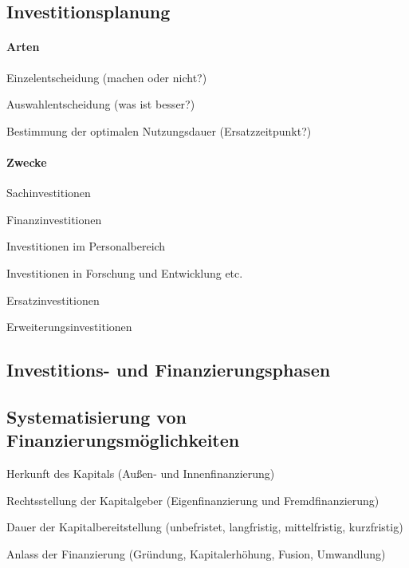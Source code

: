 \clearpage
\subsection{Investitionsplanung}
\paragraph{Arten}
\begin{compactitem}
	\item Einzelentscheidung (machen oder nicht?)
	\item Auswahlentscheidung (was ist besser?)
	\item Bestimmung der optimalen Nutzungsdauer (Ersatzzeitpunkt?)
\end{compactitem}

\paragraph{Zwecke}
\begin{compactitem}
	\item Sachinvestitionen
	\item Finanzinvestitionen
	\item Investitionen im Personalbereich
	\item Investitionen in Forschung und Entwicklung etc.
	\item Ersatzinvestitionen
	\item Erweiterungsinvestitionen
\end{compactitem}


\clearpage
\subsection{Investitions- und Finanzierungsphasen}

\clearpage
\subsection{Systematisierung von Finanzierungsmöglichkeiten}
\begin{compactitem}
	\item Herkunft des Kapitals (Außen- und Innenfinanzierung)
	\item Rechtsstellung der Kapitalgeber (Eigenfinanzierung und Fremdfinanzierung)
	\item Dauer der Kapitalbereitstellung (unbefristet, langfristig, mittelfristig, kurzfristig)
	\item Anlass der Finanzierung (Gründung, Kapitalerhöhung, Fusion, Umwandlung)
\end{compactitem}

